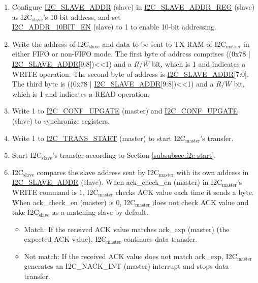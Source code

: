 \documentclass[main\_\_EN.tex]{subfiles}
\begin{document}
\begin{enumerate}
\item Configure \hyperref[fielddesc:I2CSLAVEADDR]{I2C\_SLAVE\_ADDR} (slave) in \hyperref[regdesc:I2CSLAVEADDRREG]{I2C\_SLAVE\_ADDR\_REG} (slave) as I2C$_\text{slave}$'s 10-bit address, and set \\\hyperref[fielddesc:I2CADDR10BITEN]{I2C\_ADDR\_10BIT\_EN} (slave) to 1 to enable 10-bit addressing.
\item Write the address of I2C$_\text{slave}$ and data to be sent to TX RAM of I2C$_\text{master}$ in either FIFO or non-FIFO mode. The first byte of address comprises ((0x78 | \hyperref[fielddesc:I2CSLAVEADDR]{I2C\_SLAVE\_ADDR}[9:8])<<1) and a $R/\overline W$ bit, which is 1 and indicates a WRITE operation. The second byte of address is \hyperref[fielddesc:I2CSLAVEADDR]{I2C\_SLAVE\_ADDR}[7:0]. The third byte is ((0x78 | \hyperref[fielddesc:I2CSLAVEADDR]{I2C\_SLAVE\_ADDR}[9:8])<<1) and a $R/\overline W$ bit, which is 1 and indicates a READ operation.
\item Write 1 to \hyperref[fielddesc:I2CCONFUPGATE]{I2C\_CONF\_UPGATE} (master) and \hyperref[fielddesc:I2CCONFUPGATE]{I2C\_CONF\_UPGATE} (slave) to synchronize registers.
\item Write 1 to \hyperref[fielddesc:I2CTRANSSTART]{I2C\_TRANS\_START} (master) to start I2C$_\text{master}$'s transfer.
\item Start I2C$_\text{slave}$'s transfer according to Section \ref{subsubsec:i2c-start}.
\item I2C$_\text{slave}$ compares the slave address sent by I2C$_\text{master}$ with its own address in \hyperref[fielddesc:I2CSLAVEADDR]{I2C\_SLAVE\_ADDR} (slave). When ack\_check\_en (master) in I2C$_\text{master}$'s WRITE command is 1, I2C$_\text{master}$ checks ACK value each time it sends a byte. When ack\_check\_en (master) is 0, I2C$_\text{master}$ does not check ACK value and take I2C$_\text{slave}$ as a matching slave by default.

\begin{itemize}
\item Match: If the received ACK value matches ack\_exp (master) (the expected ACK value), I2C$_\text{master}$ continues data transfer.
\item Not match: If the received ACK value does not match ack\_exp, I2C$_\text{master}$ generates an I2C\_NACK\_INT (master) interrupt and stops data transfer.
\end{itemize}


\end{enumerate}
\end{document}
